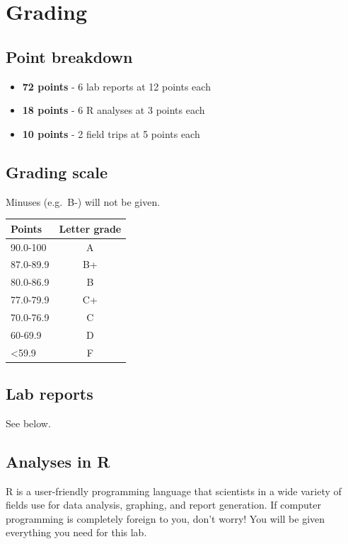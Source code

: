 \documentclass[11pt,]{article}
\begin{document}
\hypertarget{grading}{%
\section{Grading}\label{grading}}

\hypertarget{point-breakdown}{%
\subsection{Point breakdown}\label{point-breakdown}}

\begin{itemize}
\item
  \textbf{72 points} - 6 lab reports at 12 points each
\item
  \textbf{18 points} - 6 R analyses at 3 points each
\item
  \textbf{10 points} - 2 field trips at 5 points each
\end{itemize}

\hypertarget{grading-scale}{%
\subsection{Grading scale}\label{grading-scale}}

Minuses (e.g.~B-) will not be given.

\begin{longtable}[]{@{}lc@{}}
\toprule
Points & Letter grade\tabularnewline
\midrule
\endhead
90.0-100 & A\tabularnewline
87.0-89.9 & B+\tabularnewline
80.0-86.9 & B\tabularnewline
77.0-79.9 & C+\tabularnewline
70.0-76.9 & C\tabularnewline
60-69.9 & D\tabularnewline
\textless{}59.9 & F\tabularnewline
\bottomrule
\end{longtable}

\hypertarget{lab-reports}{%
\subsection{Lab reports}\label{lab-reports}}

See below.

\hypertarget{analyses-in-r}{%
\subsection{Analyses in R}\label{analyses-in-r}}

R is a user-friendly programming language that scientists in a wide
variety of fields use for data analysis, graphing, and report
generation. If computer programming is completely foreign to you, don't
worry! You will be given everything you need for this lab.
\end{document}

